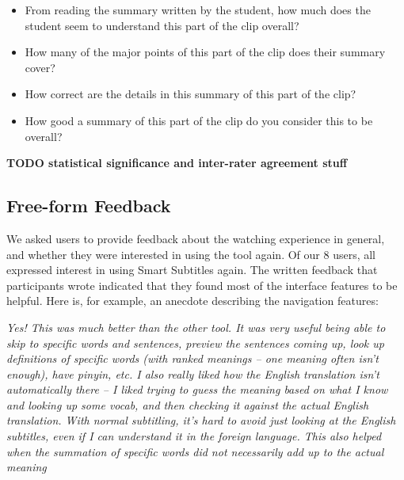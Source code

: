 \documentclass{sigchi}
\begin{document}
\begin{itemize}[noitemsep]
\item From reading the summary written by the student, how much does the student seem to understand this part of the clip overall? %
\item How many of the major points of this part of the clip does their summary cover? %
\item How correct are the details in this summary of this part of the clip? %
\item How good a summary of this part of the clip do you consider this to be overall? %
\end{itemize}

\textbf{TODO statistical significance and inter-rater agreement stuff}

\subsection{Free-form Feedback}

We asked users to provide feedback about the watching experience in general, and whether they were interested in using the tool again. Of our 8 users, all expressed interest in using Smart Subtitles again. The written feedback that participants wrote indicated that they found most of the interface features to be helpful. Here is, for example, an anecdote describing the navigation features:
	 	 	
\emph{Yes! This was much better than the other tool. It was very useful being able to skip to specific words and sentences, preview the sentences coming up, look up definitions of specific words (with ranked meanings – one meaning often isn't enough), have pinyin, etc. I also really liked how the English translation isn't automatically there – I liked trying to guess the meaning based on what I know and looking up some vocab, and then checking it against the actual English translation. With normal subtitling, it's hard to avoid just looking at the English subtitles, even if I can understand it in the foreign language. This also helped when the summation of specific words did not necessarily add up to the actual meaning}
\end{document}
